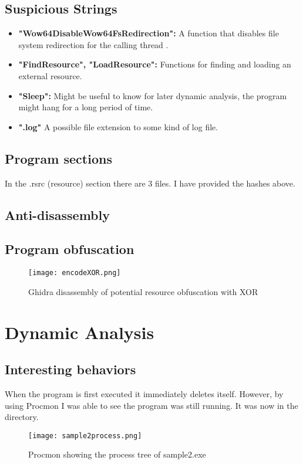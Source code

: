 \documentclass{article}
\begin{document}
    \subsection{Suspicious Strings}
    \begin{itemize}
        \item \textbf{"Wow64DisableWow64FsRedirection":} A function that disables file system redirection for the calling thread \cite{Wow64}.
        \item \textbf{"FindResource", "LoadResource":} Functions for finding and loading an external resource.
        \item \textbf{"Sleep":} Might be useful to know for later dynamic analysis, the program might hang for a long period of time.
        \item \textbf{".log"} A possible file extension to some kind of log file.
    \end{itemize}

    \subsection{Program sections}
    In the .rsrc (resource) section there are 3 files. I have provided the hashes above.

    \subsection{Anti-disassembly}
    \subsection{Program obfuscation}
    \begin{figure}[H]
        \texttt{[image: encodeXOR.png]}
        \caption{Ghidra disassembly of potential resource obfuscation with XOR}
    \end{figure}

    \section{Dynamic Analysis}

    \subsection{Interesting behaviors}
    When the program is first executed it immediately deletes itself. However, by using Procmon I was able to see the program was still running. It was now in the  directory.
    \begin{figure}[H]
        \texttt{[image: sample2process.png]}
        \caption{Procmon showing the process tree of sample2.exe}
    \end{figure}
\end{document}
